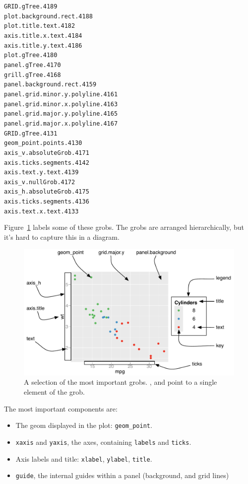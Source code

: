 \begin{alltt}
GRID.gTree.4189
  plot.background.rect.4188
  plot.title.text.4182
  axis.title.x.text.4184
  axis.title.y.text.4186
  plot.gTree.4180
    panel.gTree.4170
      grill.gTree.4168
        panel.background.rect.4159
        panel.grid.minor.y.polyline.4161
        panel.grid.minor.x.polyline.4163
        panel.grid.major.y.polyline.4165
        panel.grid.major.x.polyline.4167
      GRID.gTree.4131
        geom_point.points.4130
    axis_v.absoluteGrob.4171
      axis.ticks.segments.4142
      axis.text.y.text.4139
    axis_v.nullGrob.4172
    axis_h.absoluteGrob.4175
      axis.ticks.segments.4136
      axis.text.x.text.4133
\end{alltt}

Figure~\ref{fig:grobs} labels some of these grobs.  The grobs are arranged hierarchically, but it's hard to capture this in a diagram.

\begin{figure}[htbp]
  \centering
    \includegraphics[width=\textwidth]{grid-grobs}
  \caption{A selection of the most important grobs.  ,  and  point to a single element of the grob.}
  \label{fig:grobs}
\end{figure}

The most important components are:

\begin{itemize}
  \item The geom displayed in the plot: {\tt geom\_point}.

  \item {\tt xaxis} and {\tt yaxis}, the axes, containing {\tt labels} and {\tt ticks}.

  \item Axis labels and title: {\tt xlabel}, {\tt ylabel}, {\tt title}.

  \item {\tt guide}, the internal guides within a panel (background, and grid lines)

\end{itemize}

